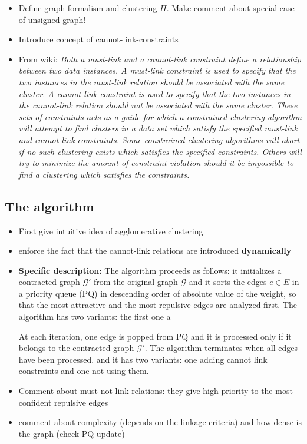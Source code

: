 \begin{itemize}
\item Define graph formalism and clustering $\Pi$. Make comment about special case of unsigned graph!
\item Introduce concept of cannot-link-constraints
\item From wiki: \emph{Both a must-link and a cannot-link constraint define a relationship between two data instances. A must-link constraint is used to specify that the two instances in the must-link relation should be associated with the same cluster. A cannot-link constraint is used to specify that the two instances in the cannot-link relation should not be associated with the same cluster. These sets of constraints acts as a guide for which a constrained clustering algorithm will attempt to find clusters in a data set which satisfy the specified must-link and cannot-link constraints. Some constrained clustering algorithms will abort if no such clustering exists which satisfies the specified constraints. Others will try to minimize the amount of constraint violation should it be impossible to find a clustering which satisfies the constraints.}

\end{itemize}
\subsection{The algorithm}
\begin{itemize}
\item First give intuitive idea of agglomerative clustering
\item enforce the fact that the cannot-link relations are introduced \textbf{dynamically}

\item \textbf{Specific description:} The algorithm proceeds as follows: it initializes a contracted graph $\mathcal{G}'$ from the original graph $\mathcal{G}$ and it sorts the edges $e\in E$ in a priority queue (PQ) in descending order of absolute value  of the weight, so that the most attractive and the most repulsive edges are analyzed first. The algorithm has two variants: the first one a

At each iteration, one edge is popped from PQ and it is processed only if it belongs to the contracted graph $\mathcal{G}'$. The algorithm terminates when all edges have been processed. and it has two variants: one adding cannot link constraints and one not using them.
\item Comment about must-not-link relations: they give high priority to the most confident repulsive edges 
\item comment about complexity (depends on the linkage criteria) and how dense is the graph (check PQ update)

\end{itemize}

